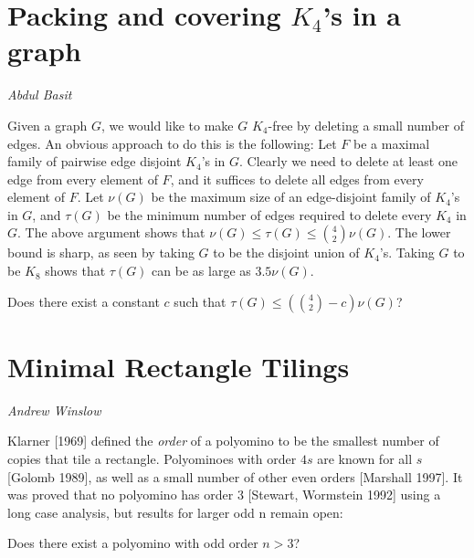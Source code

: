 \documentclass{patmorin}
\begin{document}
\section{Packing and covering $K_4$'s in a graph}

\noindent\emph{Abdul Basit}

Given a graph $G$, we would like to make $G$ $K_4$-free by deleting a
small number of edges. An obvious approach to do this is the following:
Let $F$ be a maximal family of pairwise edge disjoint $K_4$'s in
$G$. Clearly we need to delete at least one edge from every element of
$F$, and it suffices to delete all edges from every element of $F$. Let
$\nu(G)$ be the maximum size of an edge-disjoint family of $K_4$'s in
$G$, and $\tau(G)$ be the minimum number of edges required to delete
every $K_4$ in $G$. The above argument shows that $\nu(G) \leq \tau(G)
\leq {4 \choose 2} \nu(G)$. The lower bound is sharp, as seen by taking
$G$ to be the disjoint union of $K_4$'s. Taking $G$ to be $K_8$ shows
that $\tau(G)$ can be as large as $3.5 \nu(G)$.

\begin{op}
Does there exist a constant $c$ such that $\tau(G) \leq ({4 \choose 2}
- c) \nu(G)$?
\end{op}


\section{Minimal Rectangle Tilings}

\noindent\emph{Andrew Winslow}

Klarner [1969] defined the \emph{order} of a polyomino to be the smallest number of copies that tile a rectangle. Polyominoes with order $4s$ are known for all $s$ [Golomb 1989], as well as a small number of other even orders [Marshall 1997]. It was proved that no polyomino has order 3 [Stewart, Wormstein 1992] using a long case analysis, but results for larger odd n remain open:

\begin{op}
Does there exist a polyomino with odd order $n > 3$?
\end{op}
\end{document}
